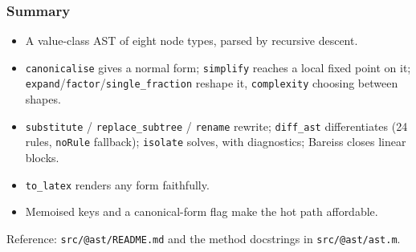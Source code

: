 \documentclass[10pt,slidestop]{beamer}
\newcommand{\code}[1]{\texttt{#1}}
\begin{document}
\begin{frame}\frametitle{Summary}
  \begin{itemize}
  \item A value-class AST of eight node types, parsed by recursive descent.\newline
  \item \code{canonicalise} gives a normal form; \code{simplify} reaches a
    local fixed point on it; \code{expand}/\code{factor}/\code{single\_fraction}
    reshape it, \code{complexity} choosing between shapes.\newline
  \item \code{substitute} / \code{replace\_subtree} / \code{rename} rewrite;
    \code{diff\_ast} differentiates (24 rules, \code{noRule} fallback);
    \code{isolate} solves, with diagnostics; Bareiss closes linear blocks.\newline
  \item \code{to\_latex} renders any form faithfully.\newline
  \item Memoised keys and a canonical-form flag make the hot path affordable.
  \end{itemize}

  \vfill
  \centering\small Reference: \texttt{src/@ast/README.md} and the method
  docstrings in \texttt{src/@ast/ast.m}.
\end{frame}
\end{document}
